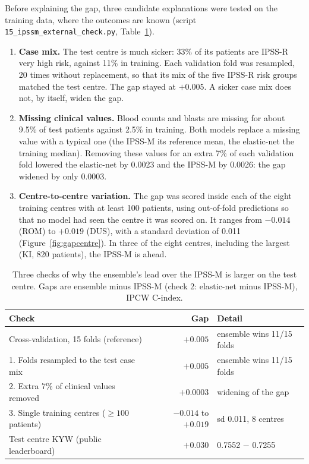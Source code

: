 \documentclass[11pt,a4paper]{article}
\begin{document}
Before explaining the gap, three candidate explanations were tested on the training data,
where the outcomes are known (script \texttt{15\_ipssm\_external\_check.py},
Table~\ref{tab:ipssmchecks}).
\begin{enumerate}
  \item \textbf{Case mix.} The test centre is much sicker: 33\% of its patients are IPSS-R
        very high risk, against 11\% in training. Each validation fold was resampled, 20
        times without replacement, so that its mix of the five IPSS-R risk groups matched the
        test centre. The gap stayed at $+0.005$. A sicker case mix does not, by itself,
        widen the gap.
  \item \textbf{Missing clinical values.} Blood counts and blasts are missing for about
        9.5\% of test patients against 2.5\% in training. Both models replace a missing
        value with a typical one (the IPSS-M its reference mean, the elastic-net the training
        median). Removing these values for an extra 7\% of each validation fold lowered the
        elastic-net by 0.0023 and the IPSS-M by 0.0026: the gap widened by only 0.0003.
  \item \textbf{Centre-to-centre variation.} The gap was scored inside each of the eight
        training centres with at least 100 patients, using out-of-fold predictions so that
        no model had seen the centre it was scored on. It ranges from $-0.014$ (ROM) to
        $+0.019$ (DUS), with a standard deviation of 0.011 (Figure~\ref{fig:gapcentre}). In
        three of the eight centres, including the largest (KI, 820 patients), the IPSS-M is
        ahead.
\end{enumerate}

\begin{table}[H]
\centering
\caption{Three checks of why the ensemble's lead over the IPSS-M is larger on the test
centre. Gaps are ensemble minus IPSS-M (check 2: elastic-net minus IPSS-M), IPCW C-index.}
\label{tab:ipssmchecks}
\small
\begin{tabular}{lrl}
\toprule
Check & Gap & Detail \\
\midrule
Cross-validation, 15 folds (reference)         & $+0.005$ & ensemble wins 11/15 folds \\
1. Folds resampled to the test case mix        & $+0.005$ & ensemble wins 11/15 folds \\
2. Extra 7\% of clinical values removed        & $+0.0003$ & widening of the gap \\
3. Single training centres ($\geq 100$ patients) & $-0.014$ to $+0.019$ & sd 0.011, 8 centres \\
Test centre KYW (public leaderboard)           & $+0.030$ & 0.7552 $-$ 0.7255 \\
\bottomrule
\end{tabular}
\end{table}
\end{document}
